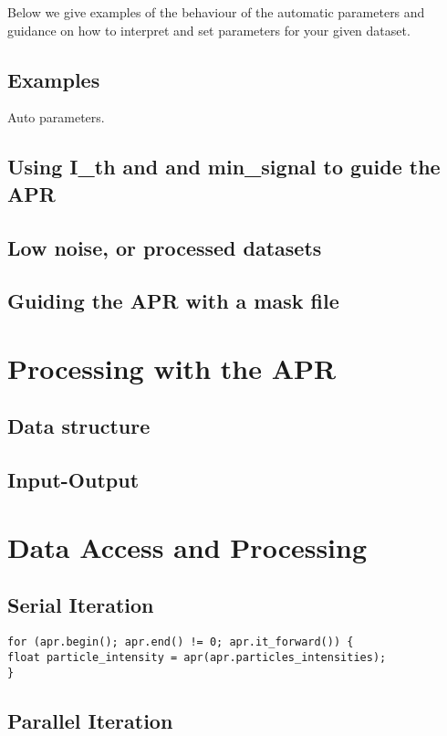 \documentclass[12pt]{article}
\begin{document}
Below we give examples of the behaviour of the automatic parameters and guidance on how to interpret and set parameters for your given dataset.
\subsection{Examples}
Auto parameters.
\subsection{Using I\_th and and min\_signal to guide the APR}

\subsection{Low noise, or processed datasets}

\subsection{Guiding the APR with a mask file}

\section{Processing with the APR}

\subsection{Data structure}

\subsection{Input-Output}

\section{Data Access and Processing}


\subsection{Serial Iteration}

\begin{lstlisting}
for (apr.begin(); apr.end() != 0; apr.it_forward()) {
float particle_intensity = apr(apr.particles_intensities);
}
\end{lstlisting}

\subsection{Parallel Iteration}
\end{document}
